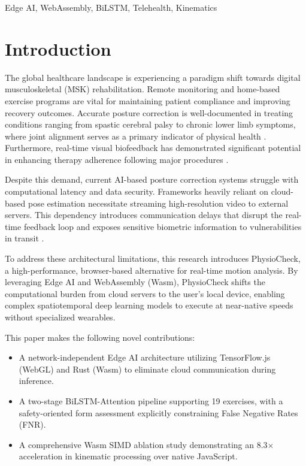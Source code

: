 \documentclass[conference]{IEEEtran}
\begin{document}
\begin{IEEEkeywords}
Edge AI, WebAssembly, BiLSTM, Telehealth, Kinematics
\end{IEEEkeywords}

\section{Introduction}
The global healthcare landscape is experiencing a paradigm shift towards digital musculoskeletal (MSK) rehabilitation. Remote monitoring and home-based exercise programs are vital for maintaining patient compliance and improving recovery outcomes. Accurate posture correction is well-documented in treating conditions ranging from spastic cerebral palsy to chronic lower limb symptoms, where joint alignment serves as a primary indicator of physical health \cite{de_morais_filho_2012}. Furthermore, real-time visual biofeedback has demonstrated significant potential in enhancing therapy adherence following major procedures \cite{raaben_2018}. 

Despite this demand, current AI-based posture correction systems struggle with computational latency and data security. Frameworks heavily reliant on cloud-based pose estimation necessitate streaming high-resolution video to external servers. This dependency introduces communication delays that disrupt the real-time feedback loop and exposes sensitive biometric information to vulnerabilities in transit \cite{kandala_2024}. 

To address these architectural limitations, this research introduces PhysioCheck, a high-performance, browser-based alternative for real-time motion analysis. By leveraging Edge AI and WebAssembly (Wasm), PhysioCheck shifts the computational burden from cloud servers to the user's local device, enabling complex spatiotemporal deep learning models to execute at near-native speeds without specialized wearables. 

This paper makes the following novel contributions:
\begin{itemize}
    \item A network-independent Edge AI architecture utilizing TensorFlow.js (WebGL) and Rust (Wasm) to eliminate cloud communication during inference.
    \item A two-stage BiLSTM-Attention pipeline supporting 19 exercises, with a safety-oriented form assessment explicitly constraining False Negative Rates (FNR).
    \item A comprehensive Wasm SIMD ablation study demonstrating an 8.3$\times$ acceleration in kinematic processing over native JavaScript.
\end{itemize}
\end{document}
